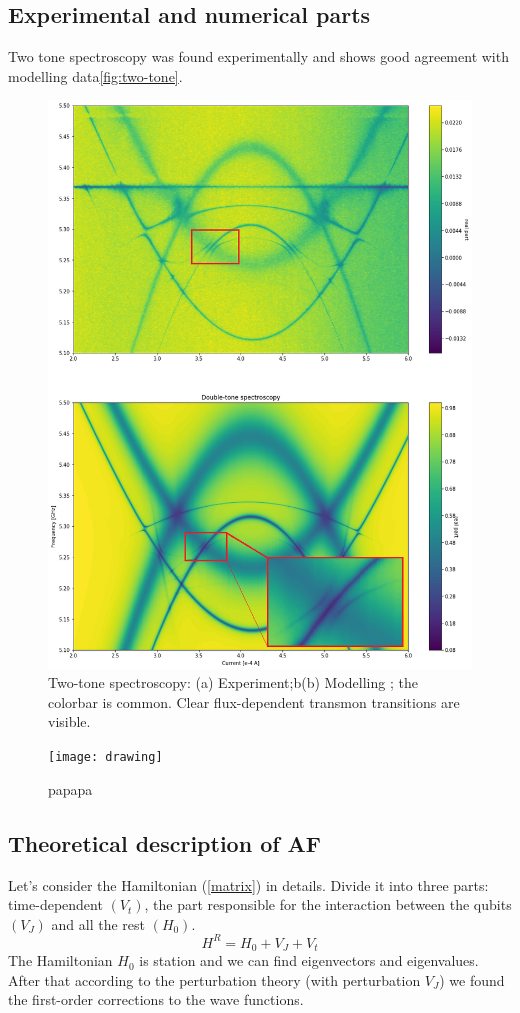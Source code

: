 \documentclass[%
 aip,
 amsmath,amssymb,
 reprint,%
]{revtex4-1}
\begin{document}
\subsection{\label{sec:level1} Experimental and numerical parts}
Two tone spectroscopy was found experimentally and shows good agreement with modelling data\autoref{fig:two-tone}. 
\begin{figure}[h]
	\centering
	\includegraphics[width=\linewidth]{two-tone}
	\caption{Two-tone spectroscopy: (a) Experiment;b(b) Modelling ; the colorbar is common.  Clear flux-dependent transmon transitions are visible.}
	\label{fig:two-tone}
\end{figure}

\begin{figure}[h]
	\centering
	\texttt{[image: drawing]}
	\caption{papapa}
	\label{fig:difdrive}
\end{figure}


\subsection{Theoretical description of AF}
Let's consider the Hamiltonian (\ref{matrix}) in details. Divide it into three parts: time-dependent $(V_t)$, the part responsible for the interaction between the qubits $(V_J)$ and all the rest $(H_0)$.
\begin{equation}
	H^R=H_0+V_J+V_t
\end{equation}
The Hamiltonian $H_0$ is station and we can find eigenvectors and eigenvalues. After that according to the perturbation theory (with perturbation $V_J$) we found the first-order corrections to the wave functions.
\end{document}
